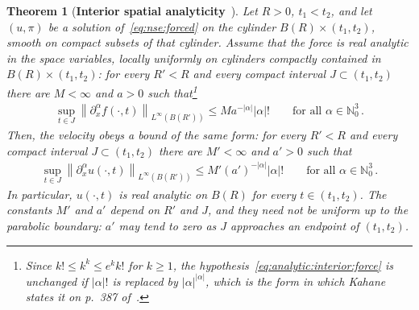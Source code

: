 \documentclass[11pt,reqno]{amsproc}
\numberwithin{equation}{section}
\newtheorem{theorem}{Theorem}[section]
\theoremstyle{remark}
\newcommand{\p}{\partial}
\newcommand{\norm}[1]{\left\|#1\right\|}
\begin{document}
\begin{theorem}[{\bf Interior spatial analyticity}~{\cite[Theorem~1.2]{Kahane69}}]
\label{thm:analytic:interior}
Let $R>0$, $t_1<t_2$, and let $(u,\pi)$ be a solution of~\eqref{eq:nse:forced} on the cylinder $B(R)\times(t_1,t_2)$, smooth on compact subsets of that cylinder. Assume that the force is real analytic in the space variables, locally uniformly on cylinders compactly contained in $B(R)\times(t_1,t_2)$: for every $R'<R$ and every compact interval $J\subset(t_1,t_2)$ there are $M<\infty$ and $a>0$ such that\footnote{Since $k!\le k^k\le e^kk!$ for $k\ge1$, the hypothesis~\eqref{eq:analytic:interior:force} is unchanged if $|\alpha|!$ is replaced by $|\alpha|^{|\alpha|}$, which is the form in which Kahane states it on p.~387 of~\cite{Kahane69}.}
\begin{align}
\sup_{t\in J}\norm{\p_x^\alpha f(\cdot,t)}_{L^\infty(B(R'))}
\le Ma^{-|\alpha|}|\alpha|!
\qquad\mbox{for all }\alpha\in\mathbb N_0^3
\,.
\label{eq:analytic:interior:force}
\end{align}
Then, the velocity obeys a bound of the same form: for every $R'<R$ and every compact interval $J\subset(t_1,t_2)$ there are $M'<\infty$ and $a'>0$ such that
\begin{align}
\sup_{t\in J}\norm{\p_x^\alpha u(\cdot,t)}_{L^\infty(B(R'))}
\le M'(a')^{-|\alpha|}|\alpha|!
\qquad\mbox{for all }\alpha\in\mathbb N_0^3
\,.
\label{eq:analytic:interior:velocity}
\end{align}
In particular, $u(\cdot,t)$ is real analytic on $B(R)$ for every $t\in(t_1,t_2)$. The constants $M'$ and $a'$ depend on $R'$ and $J$, and they need not be uniform up to the parabolic boundary: $a'$ may tend to zero as $J$ approaches an endpoint of $(t_1,t_2)$.
\end{theorem}
\end{document}
